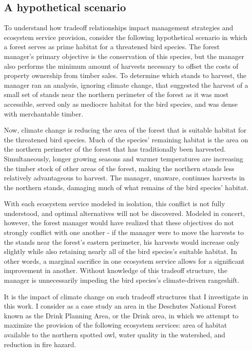 \subsection{A hypothetical scenario}
To understand how tradeoff relationships impact management strategies and ecosystem service provision, consider the following hypothetical scenario in which a forest serves as prime habitat for a threatened bird species. The forest manager's primary objective is the conservation of this species, but the manager also performs the minimum amount of harvests necessary to offset the costs of property ownership from timber sales.  To determine which stands to harvest, the manager ran an analysis, ignoring climate change, that suggested the harvest of a small set of stands near the northern perimeter of the forest as it was most accessible, served only as mediocre habitat for the bird species, and was dense with merchantable timber.

Now, climate change is reducing the area of the forest that is suitable habitat for the threatened bird species. Much of the species' remaining habitat is the area on the northern perimeter of the forest that has traditionally been harvested. Simultaneously, longer growing seasons and warmer temperatures are increasing the timber stock of other areas of the forest, making the northern stands less relatively advantageous to harvest. The manager, unaware, continues harvests in the northern stands, damaging much of what remains of the bird species' habitat.

With each ecosystem service modeled in isolation, this conflict is not fully understood, and optimal alternatives will not be discovered. Modeled in concert, however, the forest manager would have realized that these objectives do not strongly conflict with one another - if the manager were to move the harvests to the stands near the forest's eastern perimeter, his harvests would increase only slightly while also retaining nearly all of the bird species's suitable habitat. In other words, a marginal sacrifice in one ecosystem service allows for a significant improvement in another. Without knowledge of this tradeoff structure, the manager is unnecessarily impeding the bird species's climate-driven rangeshift.

It is the impact of climate change on such tradeoff structures that I investigate in this work. I consider as a case study an area in the Deschutes National Forest known as the Drink Planning Area, or the Drink area, in which we attempt to maximize the provision of the following ecosystem services: area of habitat available to the northern spotted owl, water quality in the watershed, and reduction in fire hazard.